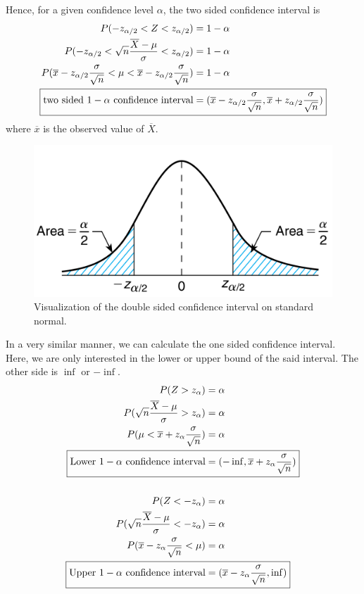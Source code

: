 \documentclass[../probability-notes.tex]{subfiles}
\begin{document}
    Hence, for a given confidence level $\alpha$, the two sided confidence interval is
    \begin{align*}
        P(-z_{\alpha /2} < Z < z_{\alpha /2}) &= 1 - \alpha\\
        P(-z_{\alpha /2} < \sqrt{n}\frac{\overline{X} - \mu}{\sigma} < z_{\alpha /2}) &= 1 - \alpha\\
        P(\overline{x}-z_{\alpha /2}\frac{\sigma}{\sqrt{n}} < \mu < \overline{x}-z_{\alpha /2}\frac{\sigma}{\sqrt{n}}) &= 1 - \alpha\\
        \Aboxed{\text{two sided $1 - \alpha$ confidence interval} &= (\overline{x}-z_{\alpha /2}\frac{\sigma}{\sqrt{n}}, \overline{x}+z_{\alpha /2}\frac{\sigma}{\sqrt{n}})}\\
    \end{align*}
    where $\overline{x}$ is the observed value of $\overline{X}$.

    \begin{figure}[h]
    \includegraphics[scale=0.4]{../images/conf_1}
    \centering
    \caption{Visualization of the double sided confidence interval on standard normal.}
    \label{fig:conf_1} %
    \end{figure}

    In a very similar manner, we can calculate the one sided confidence interval. Here, we are only interested in the lower or upper bound of the said interval. The other side is $\inf$ or $-\inf$.
    \begin{align*}
        P(Z > z_{\alpha}) &= \alpha\\
        P(\sqrt{n}\frac{\overline{X} - \mu}{\sigma} > z_{\alpha}) &= \alpha\\
        P(\mu < \overline{x} + z_{\alpha}\frac{\sigma}{\sqrt{n}}) &= \alpha\\
        \Aboxed{\text{Lower $1-\alpha$ confidence interval} &= (-\inf, \overline{x} + z_{\alpha}\frac{\sigma}{\sqrt{n}})}\\
        \\
        P(Z < -z_{\alpha}) &= \alpha\\
        P(\sqrt{n}\frac{\overline{X} - \mu}{\sigma} < -z_{\alpha}) &= \alpha\\
        P(\overline{x} - z_{\alpha}\frac{\sigma}{\sqrt{n}} < \mu) &= \alpha\\
        \Aboxed{\text{Upper $1-\alpha$ confidence interval} &= (\overline{x} - z_{\alpha}\frac{\sigma}{\sqrt{n}}, \inf)}
    \end{align*}
\end{document}
